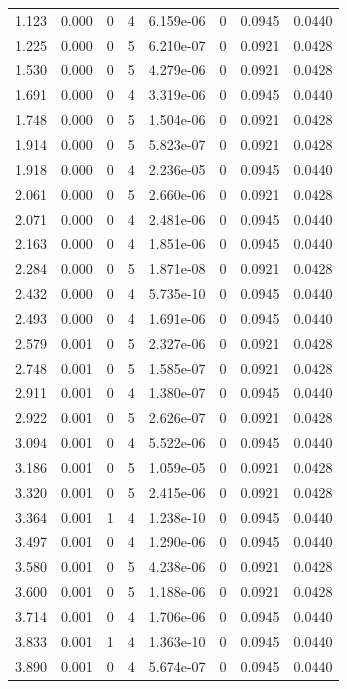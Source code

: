 \documentclass[preview]{standalone}
\begin{document}
{{\begin{tabular}{L{1.2cm}C{1.2cm} C{0.3cm}C{0.5cm} C{1.4cm}C{1.4cm} C{1.4cm}C{1.4cm}}
  1.123  &  0.000  & 0     &  4 &  6.159e-06  & 0  & 0.0945 &  0.0440   \\ 
  1.225  &  0.000  & 0     &  5 &  6.210e-07  & 0  & 0.0921 &  0.0428   \\ 
  1.530  &  0.000  & 0     &  5 &  4.279e-06  & 0  & 0.0921 &  0.0428   \\ 
  1.691  &  0.000  & 0     &  4 &  3.319e-06  & 0  & 0.0945 &  0.0440   \\ 
  1.748  &  0.000  & 0     &  5 &  1.504e-06  & 0  & 0.0921 &  0.0428   \\ 
  1.914  &  0.000  & 0     &  5 &  5.823e-07  & 0  & 0.0921 &  0.0428   \\ 
  1.918  &  0.000  & 0     &  4 &  2.236e-05  & 0  & 0.0945 &  0.0440   \\ 
  2.061  &  0.000  & 0     &  5 &  2.660e-06  & 0  & 0.0921 &  0.0428   \\ 
  2.071  &  0.000  & 0     &  4 &  2.481e-06  & 0  & 0.0945 &  0.0440   \\ 
  2.163  &  0.000  & 0     &  4 &  1.851e-06  & 0  & 0.0945 &  0.0440   \\ 
  2.284  &  0.000  & 0     &  5 &  1.871e-08  & 0  & 0.0921 &  0.0428   \\ 
  2.432  &  0.000  & 0     &  4 &  5.735e-10  & 0  & 0.0945 &  0.0440   \\ 
  2.493  &  0.000  & 0     &  4 &  1.691e-06  & 0  & 0.0945 &  0.0440   \\ 
  2.579  &  0.001  & 0     &  5 &  2.327e-06  & 0  & 0.0921 &  0.0428   \\ 
  2.748  &  0.001  & 0     &  5 &  1.585e-07  & 0  & 0.0921 &  0.0428   \\ 
  2.911  &  0.001  & 0     &  4 &  1.380e-07  & 0  & 0.0945 &  0.0440   \\ 
  2.922  &  0.001  & 0     &  5 &  2.626e-07  & 0  & 0.0921 &  0.0428   \\ 
  3.094  &  0.001  & 0     &  4 &  5.522e-06  & 0  & 0.0945 &  0.0440   \\ 
  3.186  &  0.001  & 0     &  5 &  1.059e-05  & 0  & 0.0921 &  0.0428   \\ 
  3.320  &  0.001  & 0     &  5 &  2.415e-06  & 0  & 0.0921 &  0.0428   \\ 
  3.364  &  0.001  & 1     &  4 &  1.238e-10  & 0  & 0.0945 &  0.0440   \\ 
  3.497  &  0.001  & 0     &  4 &  1.290e-06  & 0  & 0.0945 &  0.0440   \\ 
  3.580  &  0.001  & 0     &  5 &  4.238e-06  & 0  & 0.0921 &  0.0428   \\ 
  3.600  &  0.001  & 0     &  5 &  1.188e-06  & 0  & 0.0921 &  0.0428   \\ 
  3.714  &  0.001  & 0     &  4 &  1.706e-06  & 0  & 0.0945 &  0.0440   \\ 
  3.833  &  0.001  & 1     &  4 &  1.363e-10  & 0  & 0.0945 &  0.0440   \\ 
  3.890  &  0.001  & 0     &  4 &  5.674e-07  & 0  & 0.0945 &  0.0440   \\ 
\hline 
\end{tabular} 

}}
\end{document}
